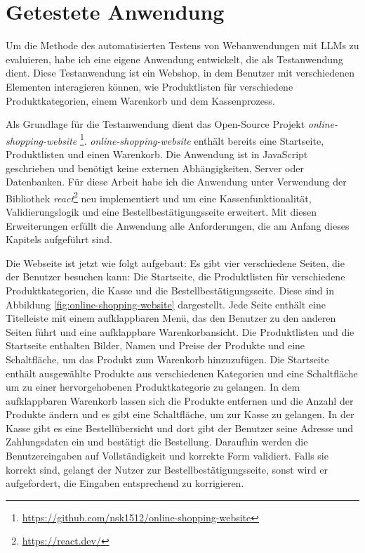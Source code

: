 \section{Getestete Anwendung}

Um die Methode des automatisierten Testens von Webanwendungen mit LLMs zu evaluieren, habe ich eine eigene Anwendung entwickelt, die als Testanwendung dient.
Diese Testanwendung ist ein Webshop, in dem Benutzer mit verschiedenen Elementen interagieren können, wie Produktlisten für verschiedene Produktkategorien, einem Warenkorb und dem Kassenprozess.

Als Grundlage für die Testanwendung dient das Open-Source Projekt \textit{online-shopping-website} \footnote{\url{https://github.com/nsk1512/online-shopping-website}}.
\textit{online-shopping-website} enthält bereits eine Startseite, Produktlisten und einen Warenkorb.
Die Anwendung ist in JavaScript geschrieben und benötigt keine externen Abhängigkeiten, Server oder Datenbanken.
Für diese Arbeit habe ich die Anwendung unter Verwendung der Bibliothek \textit{react}\footnote{\url{https://react.dev/}} neu implementiert und um eine Kassenfunktionalität, Validierungslogik und eine Bestellbestätigungsseite erweitert.
Mit diesen Erweiterungen erfüllt die Anwendung alle Anforderungen, die am Anfang dieses Kapitels aufgeführt sind.

Die Webseite ist jetzt wie folgt aufgebaut:
Es gibt vier verschiedene Seiten, die der Benutzer besuchen kann: Die Startseite, die Produktlisten für verschiedene Produktkategorien, die Kasse und die Bestellbestätigungsseite.
Diese sind in Abbildung \ref{fig:online-shopping-website} dargestellt.
Jede Seite enthält eine Titelleiste mit einem aufklappbaren Menü, das den Benutzer zu den anderen Seiten führt und eine aufklappbare Warenkorbansicht.
Die Produktlisten und die Startseite enthalten Bilder, Namen und Preise der Produkte und eine Schaltfläche, um das Produkt zum Warenkorb hinzuzufügen.
Die Startseite enthält ausgewählte Produkte aus verschiedenen Kategorien und eine Schaltfläche um zu einer hervorgehobenen Produktkategorie zu gelangen.
In dem aufklappbaren Warenkorb lassen sich die Produkte entfernen und die Anzahl der Produkte ändern und es gibt eine Schaltfläche, um zur Kasse zu gelangen.
In der Kasse gibt es eine Bestellübersicht und dort gibt der Benutzer seine Adresse und Zahlungsdaten ein und bestätigt die Bestellung.
Daraufhin werden die Benutzereingaben auf Vollständigkeit und korrekte Form validiert.
Falls sie korrekt sind, gelangt der Nutzer zur Bestellbestätigungsseite, sonst wird er aufgefordert, die Eingaben entsprechend zu korrigieren.

